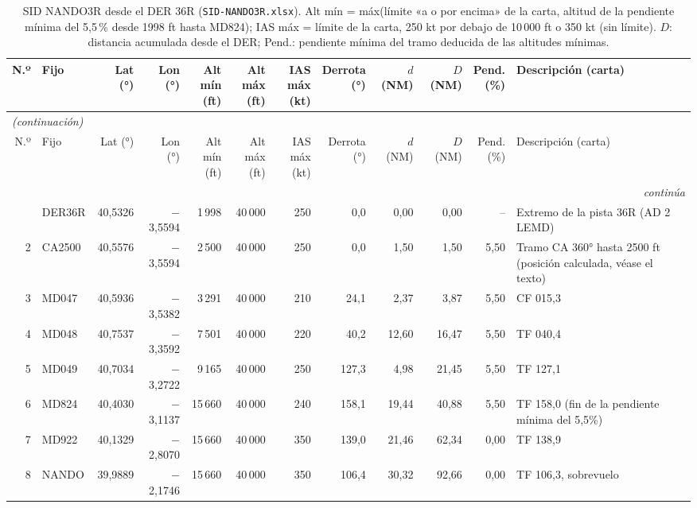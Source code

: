 \begingroup\scriptsize\setlength{\tabcolsep}{2.8pt}
\begin{longtable}{rlrrrrrrrrr>{\raggedright\arraybackslash}p{3.4cm}}
\caption{SID NANDO3R desde el DER 36R (\texttt{SID-NANDO3R.xlsx}). Alt mín = máx(límite «a o por encima» de la carta, altitud de la pendiente mínima del 5,5\,\% desde 1998 ft hasta MD824); IAS máx = límite de la carta, 250 kt por debajo de 10\,000 ft o 350 kt (sin límite). $D$: distancia acumulada desde el DER; Pend.: pendiente mínima del tramo deducida de las altitudes mínimas.}\label{tab:sid}\\
\toprule
N.º & Fijo & Lat (°) & Lon (°) & \makecell{Alt mín\\(ft)} & \makecell{Alt máx\\(ft)} & \makecell{IAS máx\\(kt)} & \makecell{Derrota\\(°)} & \makecell{$d$\\(NM)} & \makecell{$D$\\(NM)} & \makecell{Pend.\\(\%)} & Descripción (carta)\\
\midrule
\endfirsthead
\multicolumn{12}{l}{\small\itshape (continuación)}\\
\toprule
N.º & Fijo & Lat (°) & Lon (°) & \makecell{Alt mín\\(ft)} & \makecell{Alt máx\\(ft)} & \makecell{IAS máx\\(kt)} & \makecell{Derrota\\(°)} & \makecell{$d$\\(NM)} & \makecell{$D$\\(NM)} & \makecell{Pend.\\(\%)} & Descripción (carta)\\
\midrule
\endhead
\midrule
\multicolumn{12}{r}{\small\itshape continúa}\\
\endfoot
\bottomrule
\endlastfoot
1 & DER36R & 40,5326 & $-$3,5594 & 1\,998 & 40\,000 & 250 & 0,0 & 0,00 & 0,00 & -- & \scriptsize Extremo de la pista 36R (AD 2 LEMD)\\
2 & CA2500 & 40,5576 & $-$3,5594 & 2\,500 & 40\,000 & 250 & 0,0 & 1,50 & 1,50 & 5,50 & \scriptsize Tramo CA 360° hasta 2500 ft (posición calculada, véase el texto)\\
3 & MD047 & 40,5936 & $-$3,5382 & 3\,291 & 40\,000 & 210 & 24,1 & 2,37 & 3,87 & 5,50 & \scriptsize CF 015,3\\
4 & MD048 & 40,7537 & $-$3,3592 & 7\,501 & 40\,000 & 220 & 40,2 & 12,60 & 16,47 & 5,50 & \scriptsize TF 040,4\\
5 & MD049 & 40,7034 & $-$3,2722 & 9\,165 & 40\,000 & 250 & 127,3 & 4,98 & 21,45 & 5,50 & \scriptsize TF 127,1\\
6 & MD824 & 40,4030 & $-$3,1137 & 15\,660 & 40\,000 & 240 & 158,1 & 19,44 & 40,88 & 5,50 & \scriptsize TF 158,0 (fin de la pendiente mínima del 5,5\%)\\
7 & MD922 & 40,1329 & $-$2,8070 & 15\,660 & 40\,000 & 350 & 139,0 & 21,46 & 62,34 & 0,00 & \scriptsize TF 138,9\\
8 & NANDO & 39,9889 & $-$2,1746 & 15\,660 & 40\,000 & 350 & 106,4 & 30,32 & 92,66 & 0,00 & \scriptsize TF 106,3, sobrevuelo\\
\end{longtable}
\endgroup
